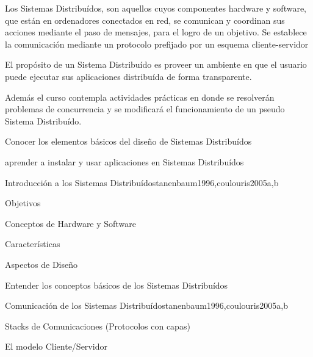 \begin{syllabus}


\begin{justification}
Los Sistemas Distribuídos, son aquellos cuyos componentes hardware y software, que están en ordenadores conectados en red, se comunican y coordinan sus acciones mediante el paso de mensajes, para el logro de un objetivo. Se establece la comunicación mediante un protocolo prefijado por un esquema cliente-servidor

El propósito de un Sistema Distribuído es proveer un ambiente en que el usuario puede ejecutar sus aplicaciones distribuída de forma transparente.

Además el curso contempla actividades prácticas en donde se resolverán problemas de concurrencia y se modificará el funcionamiento de un pseudo Sistema Distribuído.
\end{justification}

\begin{goals}
\item Conocer los elementos básicos del diseño de Sistemas Distribuídos
\item aprender a instalar y usar aplicaciones en Sistemas Distribuídos
\end{goals}

\begin{outcomes}
\end{outcomes}

\begin{unit}{Introducción a los Sistemas Distribuídos}{tanenbaum1996,coulouris2005}{a,b}
   \begin{topics}
      \item Objetivos
      \item Conceptos de Hardware y Software
      \item Características
      \item Aspectos de Diseño
   \end{topics}

   \begin{learningoutcomes}
      \item Entender los conceptos básicos de los Sistemas Distribuídos
   \end{learningoutcomes}
\end{unit}

\begin{unit}{Comunicación de los Sistemas Distribuídos}{tanenbaum1996,coulouris2005}{a,b}
   \begin{topics}
      \item Stacks de Comunicaciones (Protocolos con capas)
      \item El modelo Cliente/Servidor
   \end{topics}


\end{unit}
\end{syllabus}
